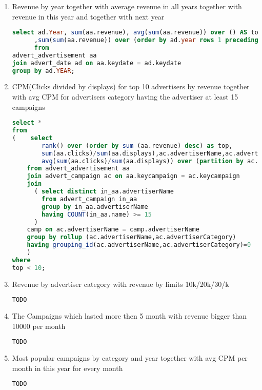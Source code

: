 \begin{enumerate}
\item    Revenue by year together with average revenue in all years together with revenue in this year and together with next year
  \begin{lstlisting}[language=sql] 
select ad.Year, sum(aa.revenue), avg(sum(aa.revenue)) over () AS total_avg 
      ,sum(sum(aa.revenue)) over (order by ad.year rows 1 preceding) AS sum_last_2_years
      from   
advert_advertisement aa
join advert_date ad on aa.keydate = ad.keydate
group by ad.YEAR;
  \end{lstlisting}
\item    CPM(Clicks divided by displays) for top 10 advertisers by revenue together with avg CPM for advertisers category having the advertiser at least 15 campaigns
  \begin{lstlisting}[language=sql] 
select *
from 
(    select
        rank() over (order by sum (aa.revenue) desc) as top,
        sum(aa.clicks)/sum(aa.displays),ac.advertiserName,ac.advertiserCategory as cat, 
        avg(sum(aa.clicks)/sum(aa.displays)) over (partition by ac.advertiserCategory)
    from advert_advertisement aa
    join advert_campaign ac on aa.keycampaign = ac.keycampaign
    join
      ( select distinct in_aa.advertiserName 
        from advert_campaign in_aa
        group by in_aa.advertiserName
        having COUNT(in_aa.name) >= 15
      )
    camp on ac.advertiserName = camp.advertiserName
    group by rollup (ac.advertiserName,ac.advertiserCategory) 
    having grouping_id(ac.advertiserName,ac.advertiserCategory)=0
    )
where 
top < 10;
  \end{lstlisting}
\item    Revenue by advertiser category with revenue by limits 10k/20k/30/k
  \begin{lstlisting}[language=sql] 
  TODO
  \end{lstlisting}
\item    The Campaigns which lasted more then 5 month with revenue bigger than 10000 per month
  \begin{lstlisting}[language=sql] 
  TODO
  \end{lstlisting}
\item    Most popular campaigns by category and year together with avg CPM per month in this year for every month
  \begin{lstlisting}[language=sql] 
  TODO
  \end{lstlisting}
\end{enumerate}

